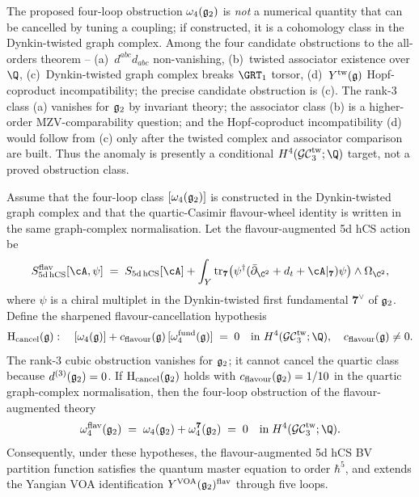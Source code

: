 \begin{remark}
\label{rem:thy-qg-obstruction-cohomological}
The proposed four-loop obstruction $\omega_4(\mathfrak{g}_2)$ is \emph{not} a
numerical quantity that can be cancelled by tuning a coupling; if
constructed, it is a cohomology class in the Dynkin-twisted graph
complex. Among the
four candidate obstructions to the all-orders theorem --
(a)~$d^{abc} d_{abc}$ non-vanishing, (b)~twisted associator existence
over $\Q$, (c)~Dynkin-twisted graph complex breaks $\GRT_1$ torsor,
(d)~$Y^{\mathrm{tw}}(\mathfrak g)$ Hopf-coproduct incompatibility; the precise
candidate obstruction is (c). The rank-$3$ class (a) vanishes for
$\mathfrak{g}_2$ by invariant theory; the associator class (b) is a higher-order
MZV-comparability question; and the Hopf-coproduct incompatibility (d)
would follow from (c) only after the twisted complex and associator
comparison are built. Thus the anomaly is presently a conditional
$H^4(\GCtw_3; \Q)$ target, not a proved obstruction class.
\end{remark}

\begin{theorem}
\label{thm:thy-qg-flavour-cancellation}
Assume that the four-loop class $[\omega_4(\mathfrak{g}_2)]$ is constructed in
the Dynkin-twisted graph complex and that the quartic-Casimir
flavour-wheel identity is written in the same graph-complex
normalisation.
Let the flavour-augmented 5d hCS action be
\begin{equation}
\label{eq:thy-qg-flavour-action}
 S_{5\mathrm{d\,hCS}}^{\mathrm{flav}}[\cA, \psi]
 \;=\; S_{5\mathrm{d\,hCS}}[\cA]
 + \int_Y \mathrm{tr}_{\mathbf 7}\bigl(\psi^\dagger (\bar\partial_{\C^2}
 + d_t + \cA|_{\mathbf 7}) \psi\bigr) \wedge \Omega_{\C^2},
\end{equation}
where $\psi$ is a chiral multiplet in the Dynkin-twisted first
fundamental $\mathbf 7^\vee$ of $\mathfrak{g}_2$. Define the sharpened
flavour-cancellation hypothesis
\begin{equation}
\label{eq:thy-qg-sharpened-hypothesis}
 \mathrm{H}_{\mathrm{cancel}}(\fgg):
 \quad
 [\omega_4(\fgg)] +
 c_{\mathrm{flavour}}(\fgg)\,[\omega_4^{\mathrm{fund}}(\fgg)]
 \;=\;0
 \quad\text{in } H^4(\GCtw_3;\Q),
 \quad c_{\mathrm{flavour}}(\fgg) \ne 0.
\end{equation}
The rank-$3$ cubic obstruction vanishes for $\mathfrak{g}_2$; it cannot cancel
the quartic class because $d^{(3)}(\mathfrak{g}_2)=0$. If
$\mathrm H_{\mathrm{cancel}}(\mathfrak{g}_2)$ holds with
$c_{\mathrm{flavour}}(\mathfrak{g}_2) = 1/10$ in the quartic graph-complex
normalisation, then the four-loop obstruction of the flavour-augmented
theory
\begin{equation*}
 \omega_4^{\mathrm{flav}}(\gtwo)
 \;=\; \omega_4(\gtwo) + \omega_4^{\mathbf 7}(\gtwo)
 \;=\; 0 \quad \text{in}\; H^4(\GCtw_3; \Q).
\end{equation*}
Consequently, under these hypotheses, the flavour-augmented 5d hCS BV partition function satisfies the
quantum master equation to order $\hbar^5$, and extends the Yangian
VOA identification $Y^{\mathrm{VOA}}(\mathfrak{g}_2)^{\mathrm{flav}}$ through five loops.
\end{theorem}


